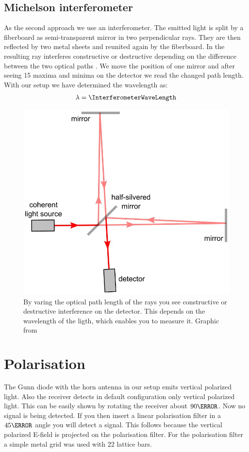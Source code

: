 \documentclass[a4paper,10pt,twocolumn]{article}
\begin{document}
    \subsection{Michelson interferometer}
    As the second approach we use an interferometer.
    The emitted light is split by a fiberboard as semi-transparent mirror in two perpendicular rays.
    They are then reflected by two metal sheets and reunited again by the fiberboard. 
    In the resulting ray interferes constructive or destructive depending on the difference between the two optical paths .
    We move the position of one mirror and after seeing 15 maxima and minima on the detector we read the changed
    path length.
    With our setup we have determined the wavelength as:
    \begin{align*}
        \lambda = \InterferometerWaveLength
    \end{align*}
    \begin{figure}[htbp]
        \includegraphics[width=0.9\linewidth]{Interferometer}
        \center
        \caption{By varing the optical path length of the rays you see constructive or destructive interference on the
        detector. This depends on the wavelength of the ligth, which enables you to measure it.
        Graphic from~\cite{imageMichelsonInterferometerWiki}}
        \label{fig:Interferometer}
    \end{figure}
    \section{Polarisation}
    The Gunn diode with the horn antenna in our setup emits vertical polarized light.
    Also the receiver detects in default configuration only vertical polarized light.
    This can be easily shown by rotating the receiver about $ 90\degree$.
    Now no signal is being detected.
    If you then insert a linear polarisation filter in a $ 45\degree$ angle you will detect a signal.
    This follows because the vertical polarized E-field is projected on the polarisation filter.
    For the polarisation filter a simple metal grid was used with 22 lattice bars.
\end{document}
